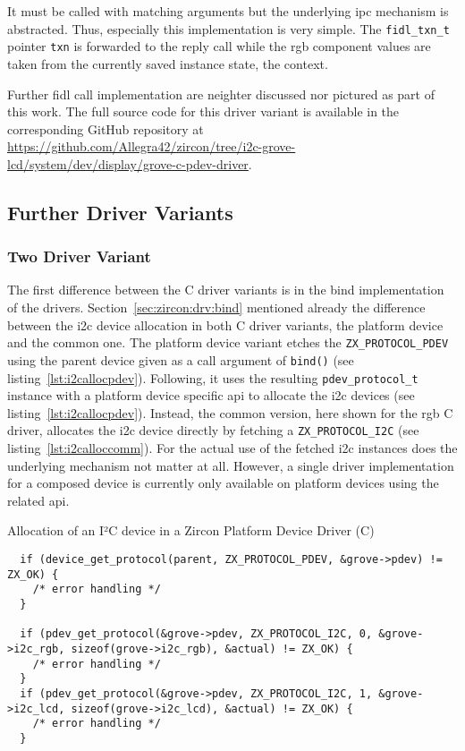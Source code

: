 It must be called with matching arguments but the underlying \ac{ipc} mechanism is abstracted.
Thus, especially this implementation is very simple.
The \texttt{fidl_txn_t} pointer \texttt{txn} is forwarded to the reply call while the \ac{rgb} component values are taken from the currently saved instance state, the context.

Further \ac{fidl} call implementation are neighter discussed nor pictured as part of this work.
The full source code for this driver variant is available in the corresponding GitHub repository at \url{https://github.com/Allegra42/zircon/tree/i2c-grove-lcd/system/dev/display/grove-c-pdev-driver}.


\subsection{Further Driver Variants}

\subsubsection*{Two Driver Variant} 
The first difference between the C driver variants is in the bind implementation of the drivers.
Section~\ref{sec:zircon:drv:bind} mentioned already the difference between the \ac{i2c} device allocation in both C driver variants, the platform device and the common one.
The platform device variant etches the \texttt{ZX_PROTOCOL_PDEV} using the parent device given as a call argument of \texttt{bind()} (see listing~\ref{lst:i2callocpdev}). 
Following, it uses the resulting \texttt{pdev_protocol_t} instance with a platform device specific \ac{api} to allocate the \ac{i2c} devices (see listing~\ref{lst:i2callocpdev}).
Instead, the common version, here shown for the \ac{rgb} C driver, allocates the \ac{i2c} device directly by fetching a \texttt{ZX_PROTOCOL_I2C} (see listing~\ref{lst:i2calloccomm}).
For the actual use of the fetched \ac{i2c} instances does the underlying mechanism not matter at all.
However, a single driver implementation for a composed device is currently only available on platform devices using the related \ac{api}.

\begin{listing}[H]
\caption{Allocation of an I²C device in a Zircon Platform Device Driver (C)}
\label{lst:i2callocpdev}
\begin{verbatim}
  if (device_get_protocol(parent, ZX_PROTOCOL_PDEV, &grove->pdev) != ZX_OK) {
    /* error handling */
  }

  if (pdev_get_protocol(&grove->pdev, ZX_PROTOCOL_I2C, 0, &grove->i2c_rgb, sizeof(grove->i2c_rgb), &actual) != ZX_OK) {
    /* error handling */
  }
  if (pdev_get_protocol(&grove->pdev, ZX_PROTOCOL_I2C, 1, &grove->i2c_lcd, sizeof(grove->i2c_lcd), &actual) != ZX_OK) {
    /* error handling */
  }
\end{verbatim}
\end{listing}

